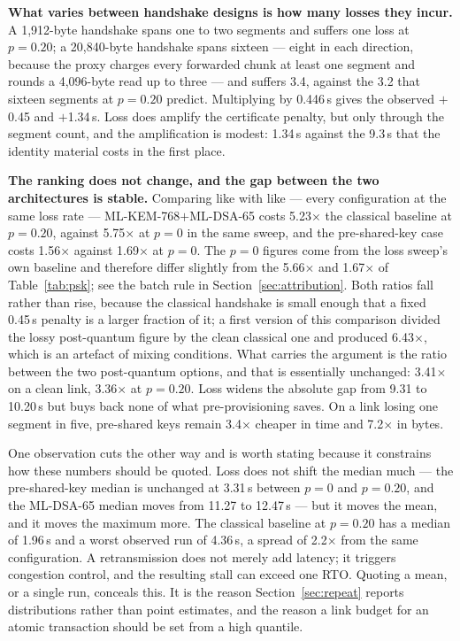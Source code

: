 \documentclass[drones,article,submit,pdftex,moreauthors]{Definitions/mdpi}
\newcommand{\mlkem}{ML-KEM}
\newcommand{\mldsa}{ML-DSA}
\begin{document}
\textbf{What varies between handshake designs is how many losses they
incur.} A 1{,}912-byte handshake spans one to two segments and suffers
one loss at $p=0.20$; a 20{,}840-byte handshake spans sixteen --- eight
in each direction, because the proxy charges every forwarded chunk at
least one segment and rounds a 4{,}096-byte read up to three --- and
suffers 3.4, against the 3.2 that sixteen segments at $p=0.20$ predict.
Multiplying by 0.446\,s gives the observed $+$0.45 and
$+$1.34\,s. Loss does amplify the certificate penalty, but only through
the segment count, and the amplification is modest: 1.34\,s against the
9.3\,s that the identity material costs in the first place.

\textbf{The ranking does not change, and the gap between the two
architectures is stable.} Comparing like with like --- every
configuration at the same loss rate --- \mlkem{}-768$+$\mldsa{}-65 costs
5.23$\times$ the classical baseline at $p=0.20$, against 5.75$\times$ at
$p=0$ in the same sweep, and the pre-shared-key case costs 1.56$\times$
against 1.69$\times$ at $p=0$. The $p=0$ figures come from the loss
sweep's own baseline and therefore differ slightly from the
5.66$\times$ and 1.67$\times$ of Table~\ref{tab:psk}; see the
batch rule in Section~\ref{sec:attribution}. Both ratios fall rather than rise, because the classical
handshake is small enough that a fixed 0.45\,s penalty is a larger
fraction of it; a first version of this comparison divided the lossy
post-quantum figure by the clean classical one and produced 6.43$\times$,
which is an artefact of mixing conditions. What carries the argument is
the ratio between the two post-quantum options, and that is essentially
unchanged: 3.41$\times$ on a clean link, 3.36$\times$ at $p=0.20$. Loss
widens the absolute gap from 9.31 to 10.20\,s but buys back none of what
pre-provisioning saves. On a link losing one segment in five,
pre-shared keys remain 3.4$\times$ cheaper in time and 7.2$\times$ in
bytes.

One observation cuts the other way and is worth stating because it
constrains how these numbers should be quoted. Loss does not shift the
median much --- the pre-shared-key median is unchanged at 3.31\,s
between $p=0$ and $p=0.20$, and the \mldsa{}-65 median moves from 11.27
to 12.47\,s --- but it moves the mean, and it moves the maximum more.
The classical baseline at $p=0.20$ has a median of 1.96\,s and a worst
observed run of 4.36\,s, a spread of 2.2$\times$ from the same
configuration. A retransmission does not merely add latency; it
triggers congestion control, and the resulting stall can exceed one
RTO. Quoting a mean, or a single run, conceals this. It is the reason
Section~\ref{sec:repeat} reports distributions rather than point
estimates, and the reason a link budget for an atomic transaction should
be set from a high quantile.
\end{document}
